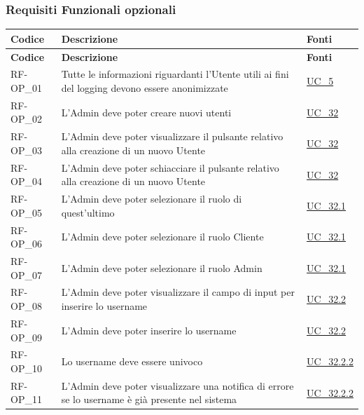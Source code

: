 \subsubsection{Requisiti Funzionali opzionali}
\renewcommand{\arraystretch}{1.15}
\begin{longtable}{|>{\raggedright}p{}|>{\raggedright\arraybackslash}p{}|>{\raggedright\arraybackslash}p{}|}
	\hline
	\rowcolor[gray]{0.9}
	\textbf{Codice} & \textbf{Descrizione} & \textbf{Fonti} \\
	\hline
	\endfirsthead
	
	\hline
	\rowcolor[gray]{0.9}
	\textbf{Codice} & \textbf{Descrizione} & \textbf{Fonti}  \\
	\hline
	\endhead
	
	\hline
	RF-OP\_01 \hypertarget{rf-op_1} & Tutte le informazioni riguardanti l'Utente utili ai fini del logging devono essere anonimizzate & \hyperref[uc_05]{UC\_5} \\
	\hline
	RF-OP\_02 \hypertarget{rf-op_2} & L'Admin deve poter creare nuovi utenti & \hyperref[uc_32]{UC\_32} \\
	\hline
	RF-OP\_03 \hypertarget{rf-op_3} & L'Admin deve poter visualizzare il pulsante relativo alla creazione di un nuovo Utente & \hyperref[uc_32]{UC\_32} \\
	\hline
	RF-OP\_04 \hypertarget{rf-op_4} & L'Admin deve poter schiacciare il pulsante relativo alla creazione di un nuovo Utente & \hyperref[uc_32]{UC\_32} \\
	\hline
	RF-OP\_05 \hypertarget{rf-op_5} & L'Admin deve poter selezionare il ruolo di quest'ultimo & \hyperref[uc_32.1]{UC\_32.1} \\
	\hline
	RF-OP\_06 \hypertarget{rf-op_6} & L'Admin deve poter selezionare il ruolo Cliente & \hyperref[uc_32.1]{UC\_32.1} \\
	\hline
	RF-OP\_07 \hypertarget{rf-op_7} & L'Admin deve poter selezionare il ruolo Admin & \hyperref[uc_32.1]{UC\_32.1} \\
	\hline
	RF-OP\_08 \hypertarget{rf-op_8} & L'Admin deve poter visualizzare il campo di input per inserire lo username & \hyperref[uc_32.2]{UC\_32.2} \\
	\hline
	RF-OP\_09 \hypertarget{rf-op_9} & L'Admin deve poter inserire lo username & \hyperref[uc_32.2]{UC\_32.2} \\
	\hline
	RF-OP\_10 \hypertarget{rf-op_10} & Lo username deve essere univoco & \hyperref[uc_32.2.2]{UC\_32.2.2} \\
	\hline
	RF-OP\_11 \hypertarget{rf-op_11} & L'Admin deve poter visualizzare una notifica di errore se lo username è già presente nel sistema & \hyperref[uc_32.2.2]{UC\_32.2.2} \\

\end{longtable}
